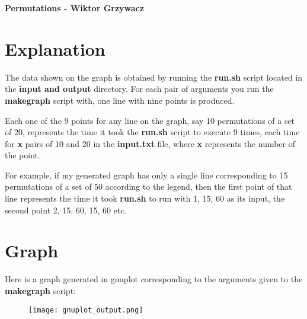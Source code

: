 \documentclass{article}
\begin{document}
\begin{center}
    \Large \textbf{Permutations - Wiktor Grzywacz}
\end{center}

\section{Explanation}
\par
The data shown on the graph is obtained by running the \textbf{run.sh} script located in the \textbf{input and output} directory.
For each pair of arguments you run the \textbf{makegraph} script with, one line with nine points is produced.
\par
Each one of the 9 points for any line on the graph, say 10 permutations of a set of 20, represents the time it took the \textbf{run.sh} script to execute 9 times,
each time for \textbf{x} pairs of 10 and 20 in the \textbf{input.txt} file, where \textbf{x} represents the number of the point.
\par
For example, if my generated graph has only a single line corresponding to 15 permutations of a set of 50 according to the legend, then
the first point of that line represents the time it took \textbf{run.sh} to run with 1, 15, 60 as its input, the second point 2, 15, 60, 15, 60 etc.

\section{Graph}

Here is a graph generated in gnuplot corresponding to the arguments given to the \textbf{makegraph} script:

\begin{figure}[h]
  \centering
  \texttt{[image: gnuplot\_output.png]}
\end{figure}
\end{document}
